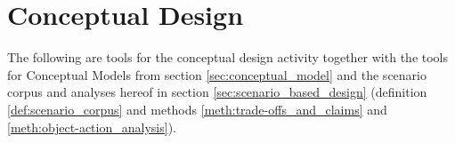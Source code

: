 \section{Conceptual Design} \label{sec:envisionment}
The following are tools for the conceptual design activity together with the tools for Conceptual Models from section \ref{sec:conceptual_model} and the scenario corpus and analyses hereof in section \ref{sec:scenario_based_design} (definition \ref{def:scenario_corpus} and methods \ref{meth:trade-offs_and_claims} and \ref{meth:object-action_analysis}).


